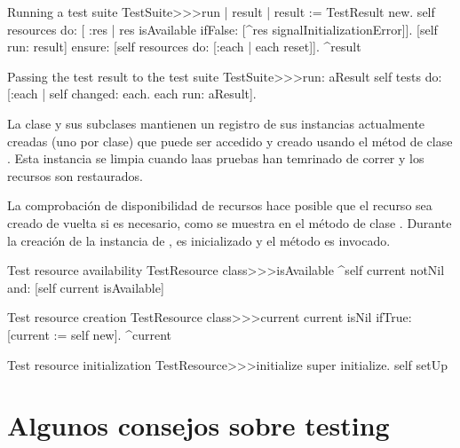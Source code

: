 \documentclass[a4paper,10pt,twoside]{book}
\begin{document}
\begin{method}[testsuiterun]{Running a test suite}
TestSuite>>>run
	| result |
 	result := TestResult new.
	self resources do: [ :res |
		res isAvailable ifFalse: [^res signalInitializationError]].
	[self run: result] ensure: [self resources do: [:each | each reset]].
	^result
\end{method}

\begin{method}[testsuiterun:]{Passing the test result to the test suite}
TestSuite>>>run: aResult
	self tests do: [:each | 
		self changed: each.
		each run: aResult].
\end{method}


La clase  y sus subclases mantienen un registro de sus instancias
actualmente creadas (uno por clase) que puede ser accedido y creado usando el m\'etod de clase
. Esta instancia se limpia cuando laas pruebas
han temrinado de correr y los recursos son restaurados.

La comprobaci\'on de disponibilidad de recursos hace posible que el recurso sea creado de vuelta si es necesario,
como se muestra en el m\'etodo de clase . Durante la
creaci\'on de la instancia de  , es inicializado y el m\'etodo  
es invocado.



\begin{method}[testresourceisavailable]{Test resource availability}
TestResource class>>>isAvailable
	^self current notNil and: [self current isAvailable]
\end{method}
\begin{method}[testresourcecurrent]{Test resource creation}
TestResource class>>>current
	current isNil ifTrue: [current := self new].
	^current
\end{method}
\begin{method}[restresourceinitialize]{Test resource initialization}
TestResource>>>initialize
	super initialize.
	self setUp
\end{method}
\section{Algunos consejos sobre testing}
\end{document}
